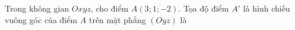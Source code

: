 \begin{ex}
Trong không gian $Oxyz$, cho điểm $A(3;1;-2)$. Tọa độ điểm $A'$ là hình chiếu vuông góc của điểm $A$ trên mặt phẳng $(Oyz)$ là
\end{ex}
